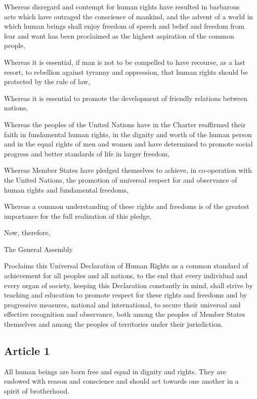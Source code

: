 \documentclass[
  ngerman,
  american,
  titlepage,
  openright,
  DIV=calc,
  toc=listof,
  listof=nochaptergap]{scrbook}
\begin{document}
Whereas disregard and contempt for human rights have resulted in
barbarous acts which have outraged the conscience of mankind, and the
advent of a world in which human beings shall enjoy freedom of speech
and belief and freedom from fear and want has been proclaimed as the
highest aspiration of the common people,

Whereas it is essential, if man is not to be compelled to have recourse,
as a last resort, to rebellion against tyranny and oppression, that
human rights should be protected by the rule of law,

Whereas it is essential to promote the development of friendly relations
between nations,

Whereas the peoples of the United Nations have in the Charter reaffirmed
their faith in fundamental human rights, in the dignity and worth of the
human person and in the equal rights of men and women and have
determined to promote social progress and better standards of life in
larger freedom,

Whereas Member States have pledged themselves to achieve, in
co-operation with the United Nations, the promotion of universal respect
for and observance of human rights and fundamental freedoms,

Whereas a common understanding of these rights and freedoms is of the
greatest importance for the full realization of this pledge,

Now, therefore,

The General Assembly

Proclaims this Universal Declaration of Human Rights as a common
standard of achievement for all peoples and all nations, to the end that
every individual and every organ of society, keeping this Declaration
constantly in mind, shall strive by teaching and education to promote
respect for these rights and freedoms and by progressive measures,
national and international, to secure their universal and effective
recognition and observance, both among the peoples of Member States
themselves and among the peoples of territories under their
jurisdiction.

\subsection{Article 1}\label{article-1-1}

All human beings are born free and equal in dignity and rights. They are
endowed with reason and conscience and should act towards one another in
a spirit of brotherhood.
\end{document}
